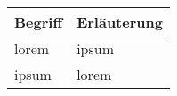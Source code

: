 

\begin{table}[ht]
    \begin{tabularx}{\textwidth}{l X}
        \toprule
        Begriff & Erläuterung \\
        \midrule
        lorem & ipsum \\
        ipsum & lorem \\
        \bottomrule
    \end{tabularx}
\end{table}
